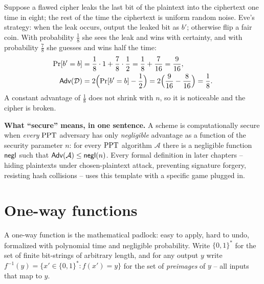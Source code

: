 \begin{example}
\label{ch08:ex-adv}
Suppose a flawed cipher leaks the last bit of the plaintext into the ciphertext one time in eight; the rest of the time the ciphertext is uniform random noise. Eve's strategy: when the leak occurs, output the leaked bit as $b'$; otherwise flip a fair coin. With probability $\tfrac{1}{8}$ she sees the leak and wins with certainty, and with probability $\tfrac{7}{8}$ she guesses and wins half the time:
\begin{align*}
  \Pr[b' = b] &= \frac{1}{8}\cdot 1 + \frac{7}{8}\cdot \frac{1}{2} = \frac{1}{8} + \frac{7}{16} = \frac{9}{16}, \\
  \mathsf{Adv}(\mathcal D) &= 2\Bigl(\Pr[b' = b] - \frac{1}{2}\Bigr) = 2\Bigl(\frac{9}{16} - \frac{8}{16}\Bigr) = \frac{1}{8}.
\end{align*}
A constant advantage of $\tfrac{1}{8}$ does not shrink with $n$, so it is noticeable and the cipher is broken.
\end{example}

\begin{focusbox}
\textbf{What ``secure'' means, in one sentence.} A scheme is computationally secure when \emph{every} $\mathrm{PPT}$ adversary has only \emph{negligible} advantage as a function of the security parameter $n$: for every $\mathrm{PPT}$ algorithm $\mathcal A$ there is a negligible function $\mathsf{negl}$ such that $\mathsf{Adv}(\mathcal A) \le \mathsf{negl}(n)$. Every formal definition in later chapters -- hiding plaintexts under chosen-plaintext attack, preventing signature forgery, resisting hash collisions -- uses this template with a specific game plugged in.
\end{focusbox}

\section{One-way functions}
\label{ch08:owf}

A one-way function is the mathematical padlock: easy to apply, hard to undo, formalized with polynomial time and negligible probability. Write $\{0,1\}^{*}$ for the set of finite bit-strings of arbitrary length, and for any output $y$ write $f^{-1}(y) = \{x' \in \{0,1\}^{*} : f(x') = y\}$ for the set of \emph{preimages} of $y$ -- all inputs that map to $y$.


